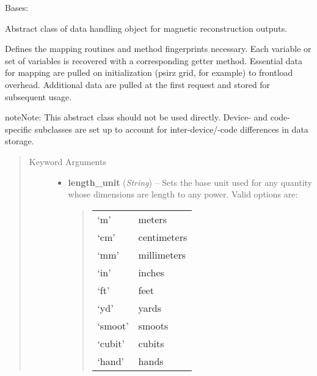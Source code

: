 \documentclass[letterpaper,10pt,english]{sphinxmanual}
\begin{document}
\begin{fulllineitems}
\label{eqtools:eqtools.core.Equilibrium}
Bases: 

Abstract class of data handling object for magnetic reconstruction outputs.

Defines the mapping routines and method fingerprints necessary. Each
variable or set of variables is recovered with a corresponding getter method.
Essential data for mapping are pulled on initialization (psirz grid, for
example) to frontload overhead. Additional data are pulled at the first
request and stored for subsequent usage.

\begin{notice}{note}{Note:}
This abstract class should not be used directly. Device- and code-
specific subclasses are set up to account for inter-device/-code
differences in data storage.
\end{notice}
\begin{quote}\begin{description}
\item[{Keyword Arguments}] \leavevmode\begin{itemize}
\item {} 
\textbf{length\_unit} (\emph{String}) --
Sets the base unit used for any quantity whose
dimensions are length to any power. Valid options are:
\begin{quote}

\begin{tabulary}{\linewidth}{|L|L|}
\hline

`m'
 & 
meters
\\

`cm'
 & 
centimeters
\\

`mm'
 & 
millimeters
\\

`in'
 & 
inches
\\

`ft'
 & 
feet
\\

`yd'
 & 
yards
\\

`smoot'
 & 
smoots
\\

`cubit'
 & 
cubits
\\

`hand'
 & 
hands
\\


\end{tabulary}
\end{quote}
\end{itemize}
\end{description}
\end{quote}
\end{fulllineitems}
\end{document}
